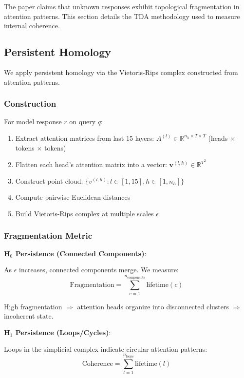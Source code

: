 \documentclass[12pt]{article}
\begin{document}
The paper claims that unknown responses exhibit topological fragmentation in attention patterns. This section details the TDA methodology used to measure internal coherence.

\subsection{Persistent Homology}

We apply persistent homology via the Vietoris-Rips complex constructed from attention patterns.

\subsubsection{Construction}

For model response $r$ on query $q$:

\begin{enumerate}
    \item Extract attention matrices from last 15 layers: $A^{(l)} \in \mathbb{R}^{n_h \times T \times T}$ (heads $\times$ tokens $\times$ tokens)
    \item Flatten each head's attention matrix into a vector: $\mathbf{v}^{(l,h)} \in \mathbb{R}^{T^2}$
    \item Construct point cloud: $\{v^{(l,h)} : l \in [1,15], h \in [1, n_h]\}$
    \item Compute pairwise Euclidean distances
    \item Build Vietoris-Rips complex at multiple scales $\epsilon$
\end{enumerate}

\subsubsection{Fragmentation Metric}

\textbf{H$_0$ Persistence (Connected Components)}:

As $\epsilon$ increases, connected components merge. We measure:
\begin{equation}
\text{Fragmentation} = \sum_{c=1}^{n_{\text{components}}} \text{lifetime}(c)
\end{equation}

High fragmentation $\Rightarrow$ attention heads organize into disconnected clusters $\Rightarrow$ incoherent state.

\textbf{H$_1$ Persistence (Loops/Cycles)}:

Loops in the simplicial complex indicate circular attention patterns:
\begin{equation}
\text{Coherence} = \sum_{l=1}^{n_{\text{loops}}} \text{lifetime}(l)
\end{equation}
\end{document}
